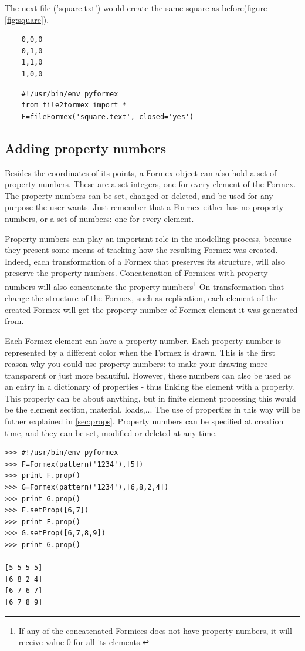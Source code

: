 The next file ('square.txt') would create the same square as before(figure \ref{fig:square}).
\begin{verbatim}
	0,0,0
	0,1,0
	1,1,0
	1,0,0
\end{verbatim}
\begin{verbatim}
	#!/usr/bin/env pyformex
	from file2formex import *
	F=fileFormex('square.text', closed='yes')
\end{verbatim}

\subsection{Adding property numbers}
\label{subsec:propnr}
Besides the coordinates of its points, a Formex object can also hold a set of property numbers. These are a set integers, one for every element of the Formex.
The property numbers can be set, changed or deleted, and be used for any purpose the user wants. Just remember that a Formex either has no property numbers, or a set of numbers: one for every element.

Property numbers can play an important role in the modelling process, because they present some means of tracking how the resulting Formex was created. Indeed, each transformation of a Formex that preserves its structure, will also preserve the property numbers. Concatenation of Formices with property numbers will also concatenate the property numbers\footnote{If any of the concatenated Formices does not have property numbers, it will receive value 0 for all its elements.}
On transformation that change the  structure of the Formex, such as replication, each element of the created Formex will get the property number of Formex element it was generated from.



Each Formex element can have a property number. Each property number is represented by a different color when the Formex is drawn. This is the first reason why you could use property numbers: to make your drawing more transparent or just more beautiful. However, these numbers can also be used as an entry in a dictionary of properties - thus linking the element with a property. This property can be about anything, but in finite element processing this would be the element section, material, loads,... The use of properties in this way will be futher explained in \ref{sec:props}.
Property numbers can be specified at creation time, and they can be set, modified or deleted at any time.  
\begin{verbatim}
>>> #!/usr/bin/env pyformex
>>> F=Formex(pattern('1234'),[5])
>>> print F.prop()
>>> G=Formex(pattern('1234'),[6,8,2,4])
>>> print G.prop()
>>> F.setProp([6,7])
>>> print F.prop()
>>> G.setProp([6,7,8,9])
>>> print G.prop()

[5 5 5 5]
[6 8 2 4]
[6 7 6 7]
[6 7 8 9]
\end{verbatim}

